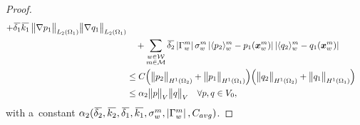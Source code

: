 \begin{proof}
\begin{align}
        + \overbar{\delta_1}\overbar{k_1}\, \norm{\grad p_1}_{L_2(\Omega_1)} \norm{\grad q_1}_{L_2(\Omega_1)} \nonumber\\
        &\quad + \sum_{\substack{w\in \mathcal{W} \\ m\in \mathcal{M}}} \overbar{\delta_2} \abs{\Gamma^m_w} \sigma^m_w
            \abs{\avg{p_2}^m_w - p_1(\vc x^m_w)}\abs{\avg{q_2}^m_w - q_1(\vc x^m_w)} \nonumber\\
    &\leq C \Big( \norm{p_2}_{H^1(\Omega_2)} + \norm{p_1}_{H^1(\Omega_1)} \Big) \Big( \norm{q_2}_{H^1(\Omega_2)} + \norm{q_1}_{H^1(\Omega_1)} \Big) \nonumber\\
    &\leq \alpha_2 \norm{p}_V \norm{q}_V \quad \forall p,q\in V_0,
\end{align}
with a~constant $\alpha_2(\overbar{\delta_2},\overbar{k_2},\overbar{\delta_1},\overbar{k_1},\sigma^m_w,\abs{\Gamma^m_w},C_{avg})$.
\end{proof}

